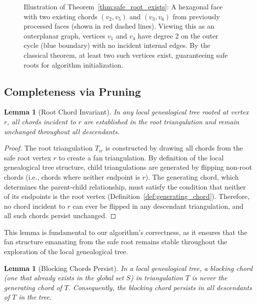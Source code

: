 \documentclass[12pt,a4paper]{article}
\newtheorem{lemma}[theorem]{Lemma}
\theoremstyle{definition}
\theoremstyle{remark}
\begin{document}
\begin{figure}[htbp]
\caption{Illustration of Theorem~\ref{thm:safe_root_exists}: A hexagonal face with two existing chords $(v_2, v_5)$ and $(v_3, v_6)$ from previously processed faces (shown in red dashed lines). Viewing this as an outerplanar graph, vertices $v_1$ and $v_4$ have degree 2 on the outer cycle (blue boundary) with no incident internal edges. By the classical theorem, at least two such vertices exist, guaranteeing safe roots for algorithm initialization.}
\label{fig:outerplanar_safe_roots}
\end{figure}

\subsection{Completeness via Pruning}

\begin{lemma}[Root Chord Invariant]
\label{lem:root_chord_invariant}
In any local genealogical tree rooted at vertex $r$, all chords incident to $r$ are established in the root triangulation and remain unchanged throughout all descendants.
\end{lemma}

\begin{proof}
The root triangulation $T_{ir}$ is constructed by drawing all chords from the safe root vertex $r$ to create a fan triangulation. By definition of the local genealogical tree structure, child triangulations are generated by flipping non-root chords (i.e., chords where neither endpoint is $r$). The generating chord, which determines the parent-child relationship, must satisfy the condition that neither of its endpoints is the root vertex (Definition~\ref{def:generating_chord}). Therefore, no chord incident to $r$ can ever be flipped in any descendant triangulation, and all such chords persist unchanged.
\end{proof}

This lemma is fundamental to our algorithm's correctness, as it ensures that the fan structure emanating from the safe root remains stable throughout the exploration of the local genealogical tree.

\begin{lemma}[Blocking Chords Persist]
\label{lem:blocking_chord_persists}
In a local genealogical tree, a blocking chord (one that already exists in the global set $S$) in triangulation $T$ is never the generating chord of $T$. Consequently, the blocking chord persists in all descendants of $T$ in the tree.
\end{lemma}
\end{document}
